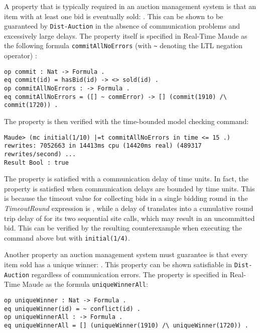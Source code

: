 \documentclass{eptcs}
\begin{document}
  


A property that is typically required in an auction management system is that an item with at least one bid is eventually sold: . This can be shown to be guaranteed by \texttt{Dist-Auction} in the absence of communication problems and excessively large delays. The property itself is specified in Real-Time Maude as the following formula \texttt{commitAllNoErrors} (with \texttt{\~} denoting the LTL negation operator) : 

\begin{small}
\begin{verbatim}
op commit : Nat -> Formula .
eq commit(id) = hasBid(id) -> <> sold(id) .
op commitAllNoErrors : -> Formula .
eq commitAllNoErrors = ([] ~ commError) -> [] (commit(1910) /\ commit(1720)) .
\end{verbatim}
\end{small}

The property is then verified with the time-bounded model checking command:  

\begin{small}
\begin{verbatim}
Maude> (mc initial(1/10) |=t commitAllNoErrors in time <= 15 .)
rewrites: 7052663 in 14413ms cpu (14420ms real) (489317 rewrites/second) ...
Result Bool : true
\end{verbatim}
\end{small}

\noindent The property is satisfied with a communication delay of  time units. In fact, the property is satisfied when communication delays are bounded by  time units. This is because the timeout value for collecting bids in a single bidding round in the \emph{TimeoutRound} expression is , while a delay of  translates into a cumulative round trip delay of  for its two sequential site calls, which may result in an uncommitted bid. This can be verified by the resulting counterexample when executing the command above but with \texttt{initial(1/4)}. 

Another property an auction management system must guarantee is that every item sold has a unique winner: . This property can be shown satisfiable in \texttt{Dist-Auction} regardless of communication errors. The property is specified in Real-Time Maude as the formula \texttt{uniqueWinnerAll}:

\begin{small}
\begin{verbatim}
op uniqueWinner : Nat -> Formula .
eq uniqueWinner(id) = ~ conflict(id) .
op uniqueWinnerAll : -> Formula .
eq uniqueWinnerAll = [] (uniqueWinner(1910) /\ uniqueWinner(1720)) .
\end{verbatim}
\end{small}
\end{document}
